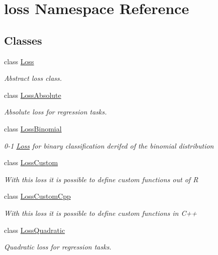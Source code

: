 \hypertarget{namespaceloss}{}\section{loss Namespace Reference}
\label{namespaceloss}
\subsection*{Classes}
\begin{DoxyCompactItemize}
\item 
class \mbox{\hyperlink{classloss_1_1_loss}{Loss}}
\begin{DoxyCompactList}\small\item\em Abstract loss class. \end{DoxyCompactList}\item 
class \mbox{\hyperlink{classloss_1_1_loss_absolute}{Loss\+Absolute}}
\begin{DoxyCompactList}\small\item\em Absolute loss for regression tasks. \end{DoxyCompactList}\item 
class \mbox{\hyperlink{classloss_1_1_loss_binomial}{Loss\+Binomial}}
\begin{DoxyCompactList}\small\item\em 0-\/1 \mbox{\hyperlink{classloss_1_1_loss}{Loss}} for binary classification derifed of the binomial distribution \end{DoxyCompactList}\item 
class \mbox{\hyperlink{classloss_1_1_loss_custom}{Loss\+Custom}}
\begin{DoxyCompactList}\small\item\em With this loss it is possible to define custom functions out of {\ttfamily R} \end{DoxyCompactList}\item 
class \mbox{\hyperlink{classloss_1_1_loss_custom_cpp}{Loss\+Custom\+Cpp}}
\begin{DoxyCompactList}\small\item\em With this loss it is possible to define custom functions in {\ttfamily C++} \end{DoxyCompactList}\item 
class \mbox{\hyperlink{classloss_1_1_loss_quadratic}{Loss\+Quadratic}}
\begin{DoxyCompactList}\small\item\em Quadratic loss for regression tasks. \end{DoxyCompactList}\end{DoxyCompactItemize}
